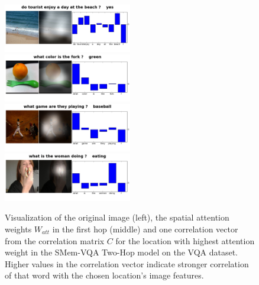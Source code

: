 \begin{figure}[t]
  \includegraphics[width=0.5\textwidth]{figures/word_atten/COCO_val2014_000000540932_5409320.jpg}
  \includegraphics[width=0.5\textwidth]{figures/word_atten/COCO_val2014_000000563730_5637302.jpg}\\
  \includegraphics[width=0.5\textwidth]{figures/word_atten/COCO_val2014_000000576875_5768752.jpg}
  \includegraphics[width=0.5\textwidth]{figures/word_atten/COCO_val2014_000000567340_5673401.jpg}
\vspace{-0.3in}
\caption{
Visualization of the original image (left), the spatial attention weights $W_{att}$ in the first hop (middle) and one correlation vector from the correlation matrix $C$ for the location with highest attention weight in the SMem-VQA Two-Hop model on the VQA dataset.
Higher values in the correlation  vector indicate  stronger correlation of that word with the chosen location's image features.}
\label{fig:VQA_hop1Atten_wordAtten}
\vspace{-0.15in}
\end{figure}




 






